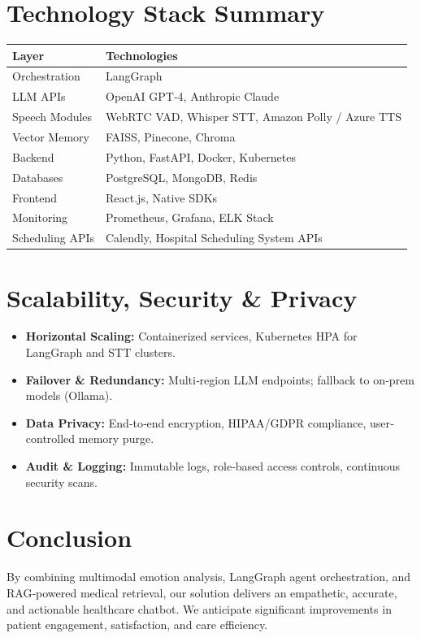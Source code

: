 \documentclass[11pt,a4paper]{article}
\begin{document}
\section{Technology Stack Summary}
\begin{tabular}{@{}ll@{}}
\toprule
\textbf{Layer} & \textbf{Technologies} \\
\midrule
Orchestration & LangGraph \\
LLM APIs & OpenAI GPT‐4, Anthropic Claude \\
Speech Modules & WebRTC VAD, Whisper STT, Amazon Polly / Azure TTS \\
Vector Memory & FAISS, Pinecone, Chroma \\
Backend & Python, FastAPI, Docker, Kubernetes \\
Databases & PostgreSQL, MongoDB, Redis \\
Frontend & React.js, Native SDKs \\
Monitoring & Prometheus, Grafana, ELK Stack \\
Scheduling APIs & Calendly, Hospital Scheduling System APIs \\
\bottomrule
\end{tabular}

\section{Scalability, Security \& Privacy}
\begin{itemize}[left=0pt]
  \item \textbf{Horizontal Scaling:} Containerized services, Kubernetes HPA for LangGraph and STT clusters.
  \item \textbf{Failover \& Redundancy:} Multi‐region LLM endpoints; fallback to on‐prem models (Ollama).
  \item \textbf{Data Privacy:} End‐to‐end encryption, HIPAA/GDPR compliance, user‐controlled memory purge.
  \item \textbf{Audit \& Logging:} Immutable logs, role‐based access controls, continuous security scans.
\end{itemize}



\section{Conclusion}
By combining multimodal emotion analysis, LangGraph agent orchestration, and RAG‐powered medical retrieval, our solution delivers an empathetic, accurate, and actionable healthcare chatbot. We anticipate significant improvements in patient engagement, satisfaction, and care efficiency.
\end{document}

